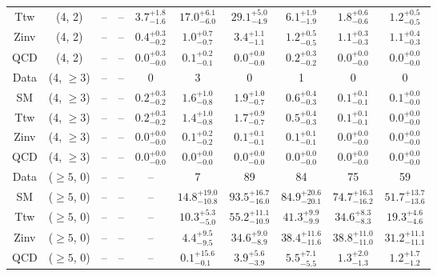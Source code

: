 \begin{table}[h!]
{\begin{tabular}{cccccccccc}
	Ttw & (4, 2) & -- & -- & $3.7^{+ 1.8 }_{- 1.6 }$ & $17.0^{+ 6.1 }_{- 6.0 }$ & $29.1^{+ 5.0 }_{- 4.9 }$ & $6.1^{+ 1.9 }_{- 1.9 }$ & $1.8^{+ 0.6 }_{- 0.6 }$ & $1.2^{+ 0.5 }_{- 0.5 }$ \\[0.5ex] 
	Zinv & (4, 2) & -- & -- & $0.4^{+ 0.3 }_{- 0.2 }$ & $1.0^{+ 0.7 }_{- 0.7 }$ & $3.4^{+ 1.1 }_{- 1.1 }$ & $1.2^{+ 0.5 }_{- 0.5 }$ & $1.1^{+ 0.3 }_{- 0.3 }$ & $1.1^{+ 0.4 }_{- 0.3 }$ \\[0.5ex] 
	QCD & (4, 2) & -- & -- & $0.0^{+ 0.3 }_{- 0.0 }$ & $0.1^{+ 0.2 }_{- 0.1 }$ & $0.0^{+ 0.0 }_{- 0.0 }$ & $0.2^{+ 0.3 }_{- 0.2 }$ & $0.0^{+ 0.0 }_{- 0.0 }$ & $0.0^{+ 0.0 }_{- 0.0 }$ \\[0.5ex] 
	Data & (4, $\ge3$) & -- & -- & 0 & 3 & 0 & 1 & 0 & 0 \\[0.5ex] 
	SM & (4, $\ge3$) & -- & -- & $0.2^{+ 0.3 }_{- 0.2 }$ & $1.6^{+ 1.0 }_{- 0.8 }$ & $1.9^{+ 1.0 }_{- 0.7 }$ & $0.6^{+ 0.4 }_{- 0.3 }$ & $0.1^{+ 0.1 }_{- 0.1 }$ & $0.1^{+ 0.0 }_{- 0.0 }$ \\[0.5ex] 
	Ttw & (4, $\ge3$) & -- & -- & $0.2^{+ 0.3 }_{- 0.2 }$ & $1.4^{+ 1.0 }_{- 0.8 }$ & $1.7^{+ 0.9 }_{- 0.7 }$ & $0.5^{+ 0.4 }_{- 0.3 }$ & $0.1^{+ 0.1 }_{- 0.1 }$ & $0.0^{+ 0.0 }_{- 0.0 }$ \\[0.5ex] 
	Zinv & (4, $\ge3$) & -- & -- & $0.0^{+ 0.0 }_{- 0.0 }$ & $0.1^{+ 0.2 }_{- 0.2 }$ & $0.1^{+ 0.1 }_{- 0.1 }$ & $0.1^{+ 0.1 }_{- 0.1 }$ & $0.0^{+ 0.0 }_{- 0.0 }$ & $0.0^{+ 0.0 }_{- 0.0 }$ \\[0.5ex] 
	QCD & (4, $\ge3$) & -- & -- & $0.0^{+ 0.0 }_{- 0.0 }$ & $0.0^{+ 0.0 }_{- 0.0 }$ & $0.0^{+ 0.0 }_{- 0.0 }$ & $0.0^{+ 0.0 }_{- 0.0 }$ & $0.0^{+ 0.0 }_{- 0.0 }$ & $0.0^{+ 0.0 }_{- 0.0 }$ \\[0.5ex] 
	Data & ($\ge5$, 0) & -- & -- & -- & 7 & 89 & 84 & 75 & 59 \\[0.5ex] 
	SM & ($\ge5$, 0) & -- & -- & -- & $14.8^{+ 19.0 }_{- 10.8 }$ & $93.5^{+ 16.7 }_{- 16.0 }$ & $84.9^{+ 20.6 }_{- 20.1 }$ & $74.7^{+ 16.3 }_{- 16.2 }$ & $51.7^{+ 13.7 }_{- 13.6 }$ \\[0.5ex] 
	Ttw & ($\ge5$, 0) & -- & -- & -- & $10.3^{+ 5.3 }_{- 5.0 }$ & $55.2^{+ 11.1 }_{- 10.9 }$ & $41.3^{+ 9.9 }_{- 9.9 }$ & $34.6^{+ 8.3 }_{- 8.3 }$ & $19.3^{+ 4.6 }_{- 4.6 }$ \\[0.5ex] 
	Zinv & ($\ge5$, 0) & -- & -- & -- & $4.4^{+ 9.5 }_{- 9.5 }$ & $34.6^{+ 9.0 }_{- 8.9 }$ & $38.4^{+ 11.6 }_{- 11.6 }$ & $38.8^{+ 11.0 }_{- 11.0 }$ & $31.2^{+ 11.1 }_{- 11.1 }$ \\[0.5ex] 
	QCD & ($\ge5$, 0) & -- & -- & -- & $0.1^{+ 15.6 }_{- 0.1 }$ & $3.9^{+ 5.6 }_{- 3.9 }$ & $5.5^{+ 7.1 }_{- 5.5 }$ & $1.3^{+ 2.0 }_{- 1.3 }$ & $1.2^{+ 1.7 }_{- 1.2 }$ \\[0.5ex] 

\end{tabular}}
\end{table}
